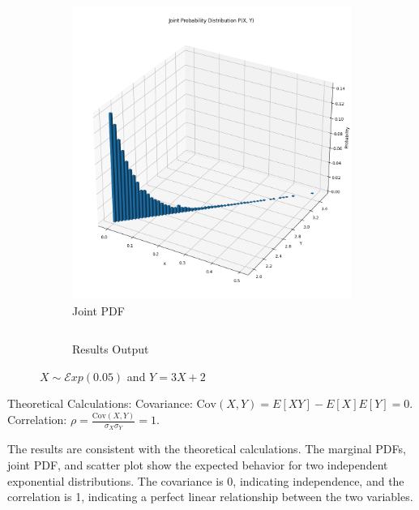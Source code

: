 \documentclass{article}
\begin{document}
\begin{figure}[H]
\begin{subfigure}{0.45\textwidth}
    \includegraphics[width=\linewidth]{results/section2/d(2).png}
    \caption{Joint PDF}
  \end{subfigure}
  \begin{subfigure}{\textwidth}
    \inputminted{text}{results/section2/d.txt}
    \caption{Results Output}
  \end{subfigure}
  \caption{$X \sim \mathcal{E}xp(0.05)$ and $Y = 3X+2$}
\end{figure}
Theoretical Calculations:
Covariance: $\text{Cov}(X,Y) = E[XY] - E[X]E[Y] = 0$.
Correlation: $\rho = \frac{\text{Cov}(X,Y)}{\sigma_X\sigma_Y} = 1$.

The results are consistent with the theoretical calculations. The marginal PDFs, joint PDF, and scatter plot show the expected behavior for two independent exponential distributions. The covariance is 0, indicating independence, and the correlation is 1, indicating a perfect linear relationship between the two variables.

\newpage
\end{document}
